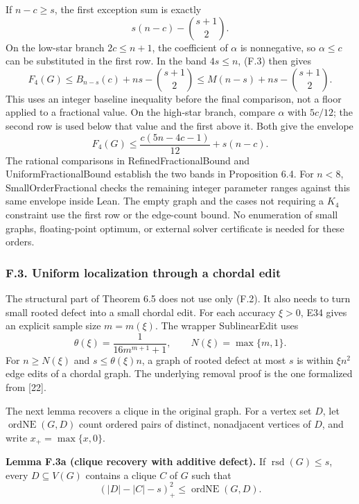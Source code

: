 \documentclass[english,11pt,a4paper]{article}
\begin{document}
If \(n-c\ge s\), the first exception sum is exactly \[
s(n-c)-\binom{s+1}{2}.
\tag{F.3}
\] On the low-star branch \(2c\le n+1\), the coefficient of \(\alpha\) is nonnegative, so \(\alpha\le c\) can be substituted in the first row. In the band \(4s\le n\), (F.3) then gives \[
F_4(G)\le B_{n-s}(c)+ns-\binom{s+1}{2}
\le M(n-s)+ns-\binom{s+1}{2}.
\] This uses an integer baseline inequality before the final comparison, not a floor applied to a fractional value. On the high-star branch, compare \(\alpha\) with \(5c/12\); the second row is used below that value and the first above it. Both give the envelope \[
F_4(G)\le\frac{c(5n-4c-1)}{12}+s(n-c).
\tag{F.4}
\] The rational comparisons in RefinedFractionalBound and UniformFractionalBound establish the two bands in Proposition 6.4. For \(n<8\), SmallOrderFractional checks the remaining integer parameter ranges against this same envelope inside Lean. The empty graph and the cases not requiring a \(K_4\) constraint use the first row or the edge-count bound. No enumeration of small graphs, floating-point optimum, or external solver certificate is needed for these orders.

\subsubsection{F.3. Uniform localization through a chordal edit}\label{f.3.-uniform-localization-through-a-chordal-edit}

The structural part of Theorem 6.5 does not use only (F.2). It also needs to turn small rooted defect into a small chordal edit. For each accuracy \(\xi>0\), E34 gives an explicit sample size \(m=m(\xi)\). The wrapper SublinearEdit uses \[
\theta(\xi)=\frac1{16m^{m+1}+1},\qquad N(\xi)=\max\{m,1\}.
\tag{F.5}
\] For \(n\ge N(\xi)\) and \(s\le\theta(\xi)n\), a graph of rooted defect at most \(s\) is within \(\xi n^2\) edge edits of a chordal graph. The underlying removal proof is the one formalized from {[}22{]}.

The next lemma recovers a clique in the original graph. For a vertex set \(D\), let \(\operatorname{ordNE}(G,D)\) count ordered pairs of distinct, nonadjacent vertices of \(D\), and write \(x_+=\max\{x,0\}\).

\textbf{Lemma F.3a (clique recovery with additive defect).} If \(\operatorname{rsd}(G)\le s\), every \(D\subseteq V(G)\) contains a clique \(C\) of \(G\) such that \[
(|D|-|C|-s)_+^2\le\operatorname{ordNE}(G,D).
\tag{F.5a}
\]
\end{document}
